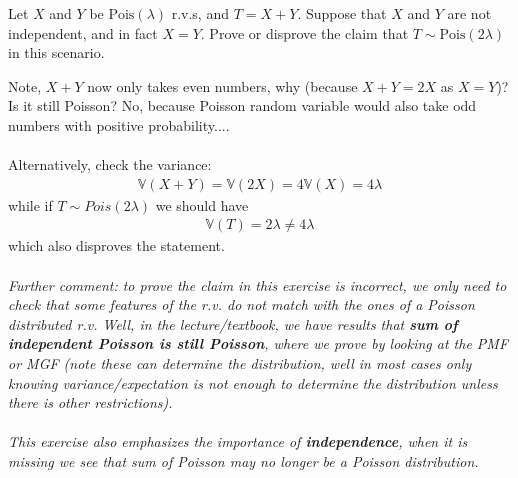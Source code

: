 
\setcounter{theorem}{26}
\begin{exercise} [BH.4.27] Let $X$ and $Y$ be $\text{Pois}(\lambda)$ r.v.s, and $T = X + Y$. Suppose that $X$ and $Y$ are not independent, and in fact $X = Y$. Prove or disprove the claim that $T \sim \text{Pois}(2\lambda)$ in this scenario.
\begin{solution}
    Note, $X+Y$ now only takes even numbers, why (because $X+Y=2X$ as $X=Y$)? Is it still Poisson? No, because Poisson random variable would also take odd numbers with positive probability....\\~\\
	Alternatively, check the variance:
	\begin{align*}
		\mathbb{V}(X+Y) =\mathbb{V}(2X) =
		4\mathbb{V}(X) =4\lambda
	\end{align*}
	while if $T\sim Pois(2\lambda)$ we should have
	\begin{align*}
		\mathbb{V}(T) =2\lambda \neq 4\lambda
	\end{align*}
	which also disproves the statement. \\~\\
	\textit{Further comment: to prove the  claim in this exercise is incorrect, we only need to check that some features of the r.v. do not match with the ones of a Poisson distributed r.v. Well, in the lecture/textbook, we have results that \textbf{sum of independent Poisson is still Poisson}, where we prove by looking at the PMF or MGF (note these can determine the distribution, well in most cases only knowing variance/expectation is not enough to determine the distribution unless there is other restrictions). \\~\\This exercise also emphasizes the importance of \textbf{independence}, when it is missing we see that sum of Poisson may no longer be a Poisson distribution.}
\end{solution}
\end{exercise}

